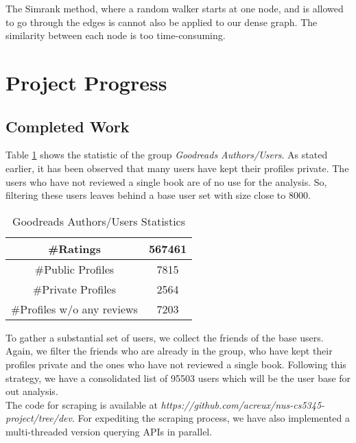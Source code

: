 \documentclass[11pt]{article}
\begin{document}
The Simrank method, where a random walker starts at one node, and is allowed to go through the edges is cannot also be applied to our dense graph.
The similarity between each node is too time-consuming. 
\section{Project Progress}

\subsection{Completed Work}
Table \ref{crawl_stat} shows the statistic of the group {\it Goodreads Authors/Users}. As stated earlier, it has been observed that many users have kept their profiles private. The users who have not reviewed a single book are of no use for the analysis. So, filtering these users leaves behind a base user set with size close to 8000.
\begin{table}[h]
\begin{center}
\begin{tabular}{cc}
\hline
\#Ratings                  & 567461 \\ \hline
\#Public Profiles          & 7815   \\ \hline
\#Private Profiles         & 2564   \\ \hline
\#Profiles w/o any reviews & 7203   \\ \hline
\end{tabular}
\caption{Goodreads Authors/Users Statistics}
\end{center}
\label{crawl_stat}
\end{table}
To gather a substantial set of users, we collect the friends of the base users. Again, we filter the friends who are already in the group, who have kept their profiles private and the ones who have not reviewed a single book. Following this strategy, we have a consolidated list of 95503 users which will be the user base for out analysis. \\
The code for scraping is available at {\it https://github.com/acreux/nus-cs5345-project/tree/dev}. For expediting the scraping process, we have also implemented a multi-threaded version querying APIs in parallel.
\end{document}
